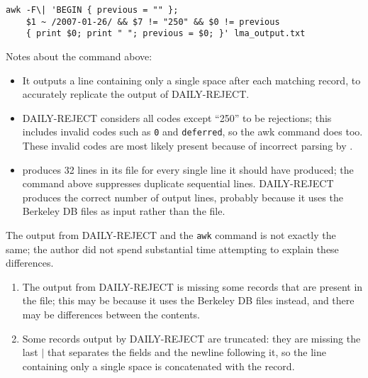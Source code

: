 
\begin{verbatim}
awk -F\| 'BEGIN { previous = "" };
    $1 ~ /2007-01-26/ && $7 != "250" && $0 != previous
    { print $0; print " "; previous = $0; }' lma_output.txt
\end{verbatim}

Notes about the command above:

\begin{itemize}

    \item It outputs a line containing only a single space after each
        matching record, to accurately replicate the output of
        DAILY-REJECT\@.

    \item DAILY-REJECT considers all  codes except ``250'' to
        be rejections; this includes invalid  codes such as
        \texttt{0} and \texttt{deferred}, so the awk command does too.
        These invalid  codes are most likely present because
        of incorrect parsing by .

    \item {} produces 32 lines in its  file for
        every single line it should have produced; the command above
        suppresses duplicate sequential lines.  DAILY-REJECT produces the
        correct number of output lines, probably because it uses the
        Berkeley DB files as input rather than the  file.

\end{itemize}

The output from DAILY-REJECT and the \texttt{awk} command is not exactly
the same; the author did not spend substantial time attempting to explain
these differences.

\begin{enumerate}

    \item The output from DAILY-REJECT is missing some records that are
        present in the  file; this may be because it uses the
        Berkeley DB files instead, and there may be differences between the
        contents.

    \item Some records output by DAILY-REJECT are truncated: they are
        missing the last $|$ that separates the fields and the newline
        following it, so the line containing only a single space is
        concatenated with the record.

\end{enumerate}

